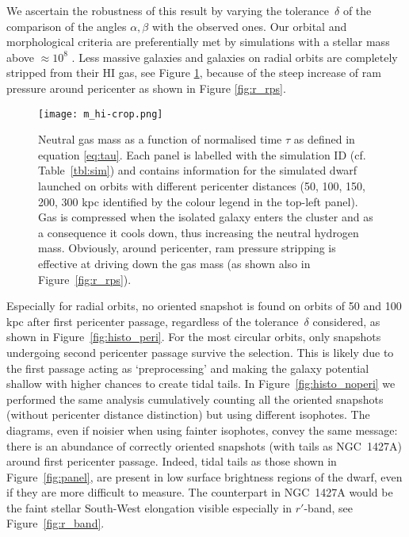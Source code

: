 We ascertain the robustness of this result by varying the tolerance~$\delta$ of the comparison of the angles $\alpha, \beta$ with the observed ones.
Our orbital and morphological criteria are preferentially met by simulations with a stellar mass above $ \approx10^8 $ \Msun{}.
Less massive galaxies and galaxies on radial orbits are completely stripped from their HI gas, see Figure \ref{fig:m_hi}, because of the steep increase of ram pressure around pericenter as shown in Figure \ref{fig:r_rps}.
\begin{figure}
\centering
\texttt{[image: m\_hi-crop.png]}
\caption{Neutral gas mass as a function of normalised time $\tau$ as defined in equation \eqref{eq:tau}.
Each panel is labelled with the simulation ID (cf. Table~\ref{tbl:sim}) and contains information for the simulated dwarf launched on orbits with different pericenter distances (50, 100, 150, 200, 300 kpc identified by the colour legend in the top-left panel). Gas is compressed when the isolated galaxy enters the cluster and as a consequence it cools down, thus increasing the neutral hydrogen mass. Obviously, around pericenter, ram pressure stripping is effective at driving down the gas mass (as shown also in Figure~\ref{fig:r_rps}).
}
\label{fig:m_hi}
\end{figure}
Especially for radial orbits, no oriented snapshot is found on orbits of 50 and 100 kpc after first pericenter passage, regardless of the tolerance~$\delta$ considered, as shown in Figure~\ref{fig:histo_peri}.
For the most circular orbits, only snapshots undergoing second pericenter passage survive the selection. This is likely due to the first passage acting as `preprocessing' and making the galaxy potential shallow with higher chances to create tidal tails.
In Figure~\ref{fig:histo_noperi} we performed the same analysis cumulatively counting all the oriented snapshots (without pericenter distance distinction) but using different isophotes.
The diagrams, even if noisier when using fainter isophotes, convey the same message: there is an abundance of correctly oriented snapshots (with tails as NGC~1427A) around first pericenter passage.
Indeed, tidal tails as those shown in Figure~\ref{fig:panel}, are present in low surface brightness regions of the dwarf, even if they are more difficult to measure.
The counterpart in NGC~1427A would be the faint stellar South-West elongation visible especially in $r'$-band, see Figure~\ref{fig:r_band}.

